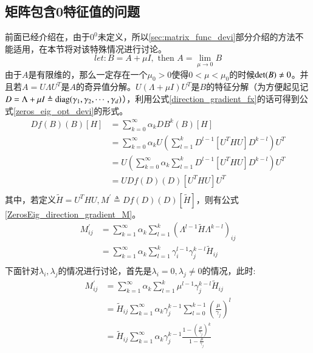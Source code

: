 \subsection{矩阵包含0特征值的问题}
\label{sec:With_Zeros_Eigenvalue}
前面已经介绍在，由于$0^{0}$未定义，所以\ref{sec:matrix_func_devi}部分介绍的方法不能适用，在本节将对该特殊情况进行讨论。
\begin{equation}
\label{zeros_eig_opt_normalization}
let:B=A+\mu I,\text{ then } A=\lim_{\mu \rightarrow 0}B
\end{equation}
由于$A$是有限维的，那么一定存在一个$\mu_0>0$使得$0<\mu<\mu_0$的时候${\rm det}(B)\neq 0$。并且若$A=U\Lambda U^{T}$是$A$的奇异值分解。$U(\Lambda+\mu I) U^{T}$是$B$的特征分解（为方便起见记$D=\Lambda+\mu I \triangleq {\rm diag}(\gamma_1,\gamma_2,\cdots,\gamma_d)$），利用公式\ref{direction_gradient_fx}的话可得到公式\ref{zeros_eig_opt_devi}的形式。
\begin{equation}
\label{zeros_eig_opt_devi}
\begin{split}
Df(B)(B)[H]&=\sum_{k=0}^{\infty}\alpha_{k}DB^{k}(B)[H]\\
&=\sum_{k=0}^{\infty}\alpha_{k}U\left(\sum_{l=1}^{k}D^{l-1}[U^{T}HU]D^{k-l}\right)U^{T}\\
&=U\left(\sum_{k=0}^{\infty}\alpha_{k}\sum_{l=1}^{k}D^{l-1}[U^{T}HU]D^{k-l}\right)U^{T}\\
&=UDf(D)(D)[U^{T}HU]U^{T}\\
\end{split}
\end{equation}
其中，若定义$\tilde{H}=U^{T}HU,M^{\prime}\triangleq Df(D)(D)[\tilde{H}]$，则有公式\ref{ZerosEig_direction_gradient_M}。
\begin{equation}
\label{ZerosEig_direction_gradient_M}
\begin{split}
M_{ij}^{\prime}&=\sum_{k=1}^{\infty} \alpha_{k}\sum_{l=1}^{k}(\Lambda^{l-1}\tilde{H}\Lambda^{k-l})_{ij}\\
&=\sum_{k=1}^{\infty} \alpha_{k}\sum_{l=1}^{k}\gamma_{i}^{l-1}\gamma_{j}^{k-l}\tilde{H}_{ij}\\
\end{split}
\end{equation}
下面针对$\lambda_i,\lambda_j$的情况进行讨论，首先是$\lambda_i=0,\lambda_j\neq 0$的情况，此时:
\begin{equation}
\label{ZerosEig_direction_gradient_M_1}
\begin{split}
M_{ij}^{\prime}&=\sum_{k=1}^{\infty} \alpha_{k}\sum_{l=1}^{k}\mu^{l-1}\gamma_{j}^{k-l}\tilde{H}_{ij}\\
&=\tilde{H}_{ij}\sum_{k=1}^{\infty}\alpha_{k}\gamma_{j}^{k-1}\sum_{l=0}^{k-1}\left(\frac{\mu}{\gamma_j}\right)^{l}\\
&=\tilde{H}_{ij}\sum_{k=1}^{\infty}\alpha_{k}\gamma_{j}^{k-1}\frac{1-\left(\frac{\mu}{\gamma_{j}}\right)^{k}}{1-\frac{\mu}{\gamma_{j}}}\\
\end{split}
\end{equation}
